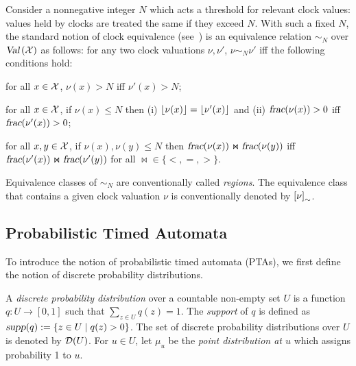 \smallskip {} Consider a nonnegative integer $N$ which acts a threshold for relevant clock values: values held by clocks are treated the same if they exceed $N$.
With such a fixed $N$, the standard notion of clock equivalence (see~\cite{DBLP:journals/tcs/AlurD94}) is an equivalence relation $\sim_N$ over $\mbox{\sl Val}\left(\mathcal{X}\right)$ as follows: for any two clock valuations $\nu,\nu'$, $\nu\sim_N\nu'$ iff the following conditions hold:
\begin{compactitem}
\item for all $x\in\mathcal{X}$, $\nu(x)>N$ iff $\nu'(x)> N$;
\item for all $x\in\mathcal{X}$, if $\nu(x)\le N$ then (i) ${\lfloor}{\nu(x)}{\rfloor}={\lfloor}{\nu'(x)}{\rfloor}$ and (ii) $\mbox{\sl frac}(\nu(x))>0$ iff $\mbox{\sl frac}(\nu'(x))>0$;
\item for all $x,y\in\mathcal{X}$, if $\nu(x),\nu(y)\le N$ then $\mbox{\sl frac}(\nu(x))\Join \mbox{\sl frac}(\nu(y))$ iff $\mbox{\sl frac}(\nu'(x))\Join \mbox{\sl frac}(\nu'(y))$ for all $\Join\in\{<,=,>\}$.
\end{compactitem}
Equivalence classes of $\sim_N$ are conventionally called \emph{regions}. The equivalence class that contains a given clock valuation $\nu$ is conventionally denoted by $\left[\nu\right]_\sim$.
\subsection{Probabilistic Timed Automata}
To introduce the notion of probabilistic timed automata (PTAs), we first define the notion of discrete probability distributions.

\smallskip {} A \emph{discrete probability distribution} over a countable non-empty set $U$ is a function $q:U\rightarrow[0,1]$ such that $\sum_{z\in U}q(z)=1$.
The \emph{support} of $q$ is defined as ${\mbox{\sl supp}}(q):=\{z\in U\mid q(z)>0\}$.
The set of discrete probability distributions over $U$ is denoted by ${\mathcal{D}}{\left(U\right)}$.
For $u \in U$, let $\mu_u$ be the \emph{point distribution at $u$} which assigns probability 1 to $u$.

